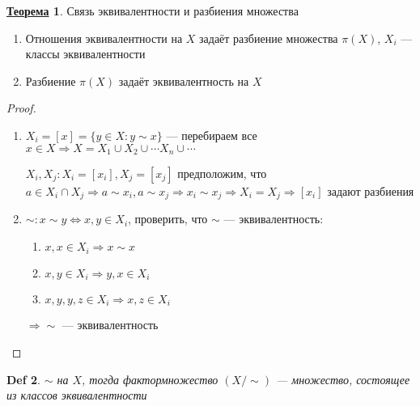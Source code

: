 \documentclass[12pt]{article}
\newenvironment{MyList}[1][4pt]{
  \begin{enumerate}[1.]
  \setlength{\parskip}{0pt}
  \setlength{\itemsep}{#1}
}{       
  \end{enumerate}
}
\def\SO{\Rightarrow}     %
\def\EQ{\Leftrightarrow} %
\theoremstyle{definition} %
\newtheorem{Thm}{\underline{Теорема}}[subsection] %
\theoremstyle{plain} %
\newtheorem{Def}[Thm]{Def} %
\theoremstyle{remark} %
\begin{document}
\begin{Thm}
    Связь эквивалентности и разбиения множества

    \begin{MyList}
        \item Отношения эквивалентности на $X$ задаёт разбиение множества $\pi(X)$, $X_i$ --- классы эквивалентности
        \item Разбиение $\pi(X)$ задаёт эквивалентность на $X$
    \end{MyList}
    \begin{proof}

        \begin{MyList}
            \item $X_i = [x] = \{y \in X: y \sim x\}$ --- перебираем все $x \in X \SO X = X_1 \cup X_2 \cup \cdots X_n \cup \cdots$

            $X_i, X_j : X_i = [x_i], X_j = [x_j]$ предположим, что $a \in X_i \cap X_j \SO a \sim x_i, a \sim x_j \SO x_i \sim x_j \SO X_i = X_j \SO [x_i]$ задают разбиения
            \item $\sim : x \sim y \EQ x, y \in X_i$, проверить, что $\sim$ --- эквивалентность:
            \begin{MyList}
                \item $x, x \in X_i \SO x \sim x$
                \item $x, y \in X_i \SO y, x \in X_i$
                \item $x, y, y, z \in X_i \SO x, z \in X_i$
            \end{MyList}
            $\SO \sim$ --- эквивалентность
        \end{MyList}
    \end{proof}
\end{Thm}

\begin{Def}
    $\sim$ на $X$, тогда фактормножество $(X/\sim)$ --- множество, состоящее из классов эквивалентности
\end{Def}
\end{document}
